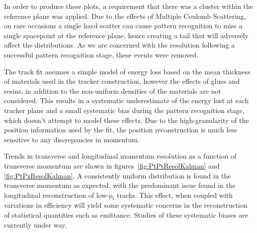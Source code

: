   In order to produce these plots, a requirement that there was a cluster within the reference plane was applied. Due to the effects of Multiple Coulomb Scattering, on rare occasions a single hard scatter can cause pattern recognition to miss a single spacepoint at the reference plane, hence creating a tail that will adversely affect the distributions. As we are concerned with the resolution following a successful pattern recognition stage, these events were removed.
  
  The track fit assumes a simple model of energy loss based on the mean thickness of materials used in the tracker construction, however the effects of glues and resins, in addition to the non-uniform densities of the materials are not considered. This results in a systematic underestimate of the energy lost at each tracker plane and a small systematic bias during the pattern recognition stage, which doesn't attempt to model these effects. Due to the high-granularity of the position information used by the fit, the position reconstruction is much less sensitive to any discrepancies in momentum. %
 
  Trends in transverse and longitudinal momentum resolution as a function of transverse momentum are shown in figures~\ref{fig:PtPtResolKalman} and \ref{fig:PtPzResolKalman}. A consistently uniform distribution is found in the transverse momentum as expected, with the predominant issue found in the longitudinal reconstruction of low-$p_t$ tracks. This effect, when coupled with variations in efficiency will yield some systematic concerns in the reconstruction of statistical quantities such as emittance. Studies of these systematic biases are currently under way.

 

